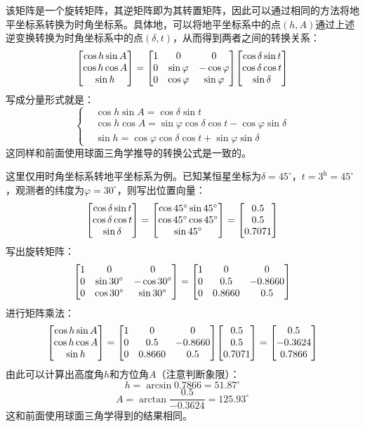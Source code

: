 \documentclass[a4paper]{article}
\begin{document}
该矩阵是一个旋转矩阵，其逆矩阵即为其转置矩阵，因此可以通过相同的方法将地平坐标系转换为时角坐标系。具体地，可以将地平坐标系中的点$(h, A)$通过上述逆变换转换为时角坐标系中的点$(\delta, t)$，从而得到两者之间的转换关系：
\[
    \mqty[\cos{h} \sin{A} \\ \cos{h} \cos{A} \\ \sin{h}] =
    \mqty[1 & 0 & 0 \\ 0 & \sin{\varphi} & -\cos{\varphi} \\ 0 & \cos{\varphi} & \sin{\varphi}]
    \mqty[\cos{\delta} \sin{t} \\ \cos{\delta} \cos{t} \\ \sin{\delta}]
\]
写成分量形式就是：
\[
    \begin{cases}
        & \cos{h}\sin{A} = \cos{\delta}\sin{t} \\
        & \cos{h}\cos{A} = \sin{\varphi}\cos{\delta}\cos{t} - \cos{\varphi}\sin{\delta} \\
        & \sin{h} = \cos{\varphi}\cos{\delta}\cos{t} + \sin{\varphi}\sin{\delta}
    \end{cases}
\]
这同样和前面使用球面三角学推导的转换公式是一致的。

这里仅用时角坐标系转地平坐标系为例。已知某恒星坐标为$\delta = 45^\circ$，$t = 3^{\mathrm{h}} = 45^\circ$，观测者的纬度为$\varphi = 30^\circ$，则写出位置向量：
\[
    \mqty[\cos{\delta} \sin{t} \\ \cos{\delta} \cos{t} \\ \sin{\delta}] =
    \mqty[\cos{45^\circ} \sin{45^\circ} \\ \cos{45^\circ} \cos{45^\circ} \\ \sin{45^\circ}] =
    \mqty[0.5 \\ 0.5 \\ 0.7071]
\]
写出旋转矩阵：
\[
    \mqty[1 & 0 & 0 \\ 0 & \sin{30^\circ} & -\cos{30^\circ} \\ 0 & \cos{30^\circ} & \sin{30^\circ}] =
    \mqty[1 & 0 & 0 \\ 0 & 0.5 & -0.8660 \\ 0 & 0.8660 & 0.5]
\]
进行矩阵乘法：
\[
    \mqty[\cos{h} \sin{A} \\ \cos{h} \cos{A} \\ \sin{h}] =
    \mqty[1 & 0 & 0 \\ 0 & 0.5 & -0.8660 \\ 0 & 0.8660 & 0.5]
    \mqty[0.5 \\ 0.5 \\ 0.7071] =
    \mqty[0.5 \\ -0.3624 \\ 0.7866]
\]
由此可以计算出高度角$h$和方位角$A$（注意判断象限）：
\[
    h = \arcsin{0.7866} = 51.87^\circ
\]
\[
    A = \arctan{\frac{0.5}{-0.3624}} = 125.93^\circ
\]
这和前面使用球面三角学得到的结果相同。
\end{document}
